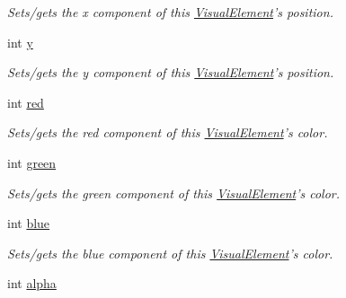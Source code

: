 \begin{DoxyCompactItemize}
\begin{DoxyCompactList}\small\item\em Sets/gets the x component of this \hyperlink{struct_picto_1_1_visual_element}{Visual\-Element}'s position. \end{DoxyCompactList}\item 
\hypertarget{struct_picto_1_1_visual_element_a9a4db3430219e1f78208eda1a89e9f38}{int \hyperlink{struct_picto_1_1_visual_element_a9a4db3430219e1f78208eda1a89e9f38}{y}}\label{struct_picto_1_1_visual_element_a9a4db3430219e1f78208eda1a89e9f38}

\begin{DoxyCompactList}\small\item\em Sets/gets the y component of this \hyperlink{struct_picto_1_1_visual_element}{Visual\-Element}'s position. \end{DoxyCompactList}\item 
\hypertarget{struct_picto_1_1_visual_element_a8f60e10e94b01dbfd59a21608faed464}{int \hyperlink{struct_picto_1_1_visual_element_a8f60e10e94b01dbfd59a21608faed464}{red}}\label{struct_picto_1_1_visual_element_a8f60e10e94b01dbfd59a21608faed464}

\begin{DoxyCompactList}\small\item\em Sets/gets the red component of this \hyperlink{struct_picto_1_1_visual_element}{Visual\-Element}'s color. \end{DoxyCompactList}\item 
\hypertarget{struct_picto_1_1_visual_element_a1c795d02093276be88d7405bd4e42f64}{int \hyperlink{struct_picto_1_1_visual_element_a1c795d02093276be88d7405bd4e42f64}{green}}\label{struct_picto_1_1_visual_element_a1c795d02093276be88d7405bd4e42f64}

\begin{DoxyCompactList}\small\item\em Sets/gets the green component of this \hyperlink{struct_picto_1_1_visual_element}{Visual\-Element}'s color. \end{DoxyCompactList}\item 
\hypertarget{struct_picto_1_1_visual_element_a440a16c6901f1fef5502658fadf009b7}{int \hyperlink{struct_picto_1_1_visual_element_a440a16c6901f1fef5502658fadf009b7}{blue}}\label{struct_picto_1_1_visual_element_a440a16c6901f1fef5502658fadf009b7}

\begin{DoxyCompactList}\small\item\em Sets/gets the blue component of this \hyperlink{struct_picto_1_1_visual_element}{Visual\-Element}'s color. \end{DoxyCompactList}\item 
\hypertarget{struct_picto_1_1_visual_element_aa03bc277daf4d3514f43bd77503ccfba}{int \hyperlink{struct_picto_1_1_visual_element_aa03bc277daf4d3514f43bd77503ccfba}{alpha}}\label{struct_picto_1_1_visual_element_aa03bc277daf4d3514f43bd77503ccfba}


\end{DoxyCompactItemize}
